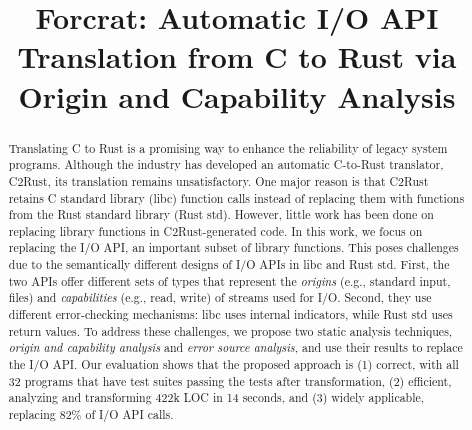 \documentclass[10pt,conference]{IEEEtran}
\begin{document}
\title{Forcrat: Automatic I/O API Translation from C to Rust via Origin and Capability Analysis}

\author{
}

\maketitle

\begin{abstract}

  Translating C to Rust is a promising way to enhance the reliability of legacy
  system programs.
  Although the industry has developed an automatic C-to-Rust translator, C2Rust,
  its translation remains unsatisfactory.
  One major reason is that C2Rust retains C standard library (libc) function
  calls instead of replacing them with functions from the Rust standard library
  (Rust std).
  However, little work has been done on replacing library functions in
  C2Rust-generated code.
  In this work, we focus on replacing the I/O API, an important subset of
  library functions.
  This poses challenges due to the semantically different designs of I/O APIs in
  libc and Rust std.
  First, the two APIs offer different sets of types that represent the
  \emph{origins} (e.g., standard input, files) and \emph{capabilities} (e.g.,
  read, write) of streams used for I/O.
  Second, they use different error-checking mechanisms: libc uses internal
  indicators, while Rust std uses return values.
  To address these challenges, we propose two static analysis techniques,
  \emph{origin and capability analysis} and \emph{error source analysis}, and
  use their results to replace the I/O API.
  Our evaluation shows that the proposed approach is
  (1) correct, with all 32 programs that have test suites passing the tests
  after transformation,
  (2) efficient, analyzing and transforming 422k LOC in 14 seconds, and
  (3) widely applicable, replacing 82\% of I/O API calls.

\end{abstract}
\end{document}
